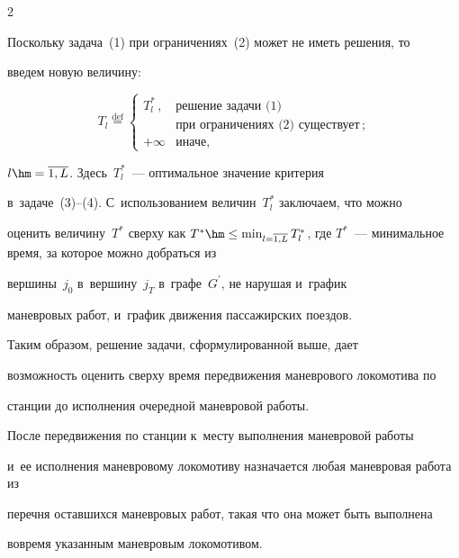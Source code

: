 \begin{multicols}{2}
      


Поскольку задача~(1) при ограничениях~(2) может не иметь решения, то 


введем новую величину:


      $$


      T_l \stackrel{\mathrm{def}}{=} \begin{cases}


      T_l^*\,, &\mbox{решение\ задачи\ (1)}\\


     & \mbox{при\ ограничениях\ (2)\ 


существует}\,;\\


      +\infty &\mbox{иначе},


      \end{cases}


      $$


$l\hm=\overline{1,L}$. Здесь~$T_l^*$~--- оптимальное значение критерия 


в~задаче~(3)--(4). С~использованием величин~$T^*_l$ заключаем, что можно 


оценить величину~$T^*$ сверху как $T^*\hm\leq \min\nolimits_{l=\overline{1,L}} 


T_l^*$, где $T^*$~--- минимальное время, за которое можно добраться из 


вершины~$j_0$ в~вершину~$j_T$ в~графе~$G^\prime$, не нарушая и~график 


маневровых работ, и~график движения пассажирских поездов.


      


      Таким образом, решение задачи, сформулированной выше, дает 


возможность оценить сверху время передвижения маневрового локомотива по 


станции до исполнения очередной маневровой работы.


      


      После передвижения по станции к~месту выполнения маневровой работы 


      и~ее исполнения маневровому локомотиву назначается любая маневровая работа из 


перечня оставшихся маневровых работ, такая что она может быть выполнена 


вовремя указанным маневровым локомотивом.


      



\end{multicols}
